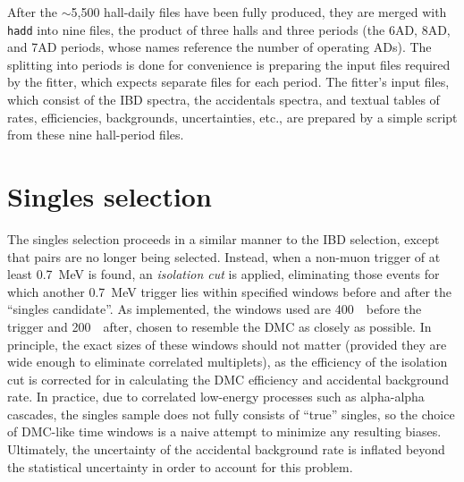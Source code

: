 \documentclass[../thesis.tex]{subfiles}
\begin{document}
After the $\sim$5,500 hall-daily files have been fully produced, they are merged
with \texttt{hadd} into nine files, the product of three halls and three periods
(the 6AD, 8AD, and 7AD periods, whose names reference the number of operating
ADs). The splitting into periods is done for convenience is preparing the input
files required by the fitter, which expects separate files for each period. The
fitter's input files, which consist of the IBD spectra, the accidentals spectra,
and textual tables of rates, efficiencies, backgrounds, uncertainties, etc., are
prepared by a simple script from these nine hall-period files.

\section{Singles selection}
\label{sec:selSingles}

The singles selection proceeds in a similar manner to the IBD selection, except
that pairs are no longer being selected. Instead, when a non-muon trigger of at
least 0.7~MeV is found, an \emph{isolation cut} is applied, eliminating those
events for which another 0.7~MeV trigger lies within specified windows before
and after the ``singles candidate''. As implemented, the windows used are
400~\us\ before the trigger and 200~\us\ after, chosen to resemble the DMC as
closely as possible. In principle, the exact sizes of these windows should not
matter (provided they are wide enough to eliminate correlated multiplets), as
the efficiency of the isolation cut is corrected for in calculating the DMC
efficiency and accidental background rate. In practice, due to correlated
low-energy processes such as alpha-alpha cascades, the singles sample does not
fully consists of ``true'' singles, so the choice of DMC-like time windows is a
naive attempt to minimize any resulting biases. Ultimately, the uncertainty of
the accidental background rate is inflated beyond the statistical uncertainty in
order to account for this problem.
\end{document}
